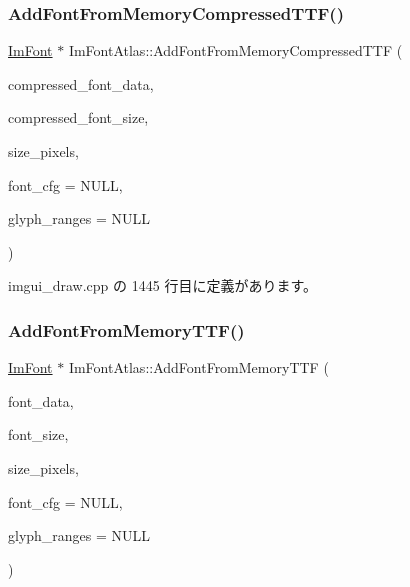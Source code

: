 \subsubsection{\texorpdfstring{Add\+Font\+From\+Memory\+Compressed\+T\+T\+F()}{AddFontFromMemoryCompressedTTF()}}
{\footnotesize\ttfamily \mbox{\hyperlink{struct_im_font}{Im\+Font}} $\ast$ Im\+Font\+Atlas\+::\+Add\+Font\+From\+Memory\+Compressed\+T\+TF (\begin{DoxyParamCaption}\item[{const void $\ast$}]{compressed\+\_\+font\+\_\+data,  }\item[{int}]{compressed\+\_\+font\+\_\+size,  }\item[{float}]{size\+\_\+pixels,  }\item[{const \mbox{\hyperlink{struct_im_font_config}{Im\+Font\+Config}} $\ast$}]{font\+\_\+cfg = {\ttfamily NULL},  }\item[{const \mbox{\hyperlink{imgui_8h_af2c7badaf05a0008e15ef76d40875e97}{Im\+Wchar}} $\ast$}]{glyph\+\_\+ranges = {\ttfamily NULL} }\end{DoxyParamCaption})}



 imgui\+\_\+draw.\+cpp の 1445 行目に定義があります。

\mbox{\label{struct_im_font_atlas_adb01397920998a18e25bd8fed3f791a7}} 
\subsubsection{\texorpdfstring{Add\+Font\+From\+Memory\+T\+T\+F()}{AddFontFromMemoryTTF()}}
{\footnotesize\ttfamily \mbox{\hyperlink{struct_im_font}{Im\+Font}} $\ast$ Im\+Font\+Atlas\+::\+Add\+Font\+From\+Memory\+T\+TF (\begin{DoxyParamCaption}\item[{void $\ast$}]{font\+\_\+data,  }\item[{int}]{font\+\_\+size,  }\item[{float}]{size\+\_\+pixels,  }\item[{const \mbox{\hyperlink{struct_im_font_config}{Im\+Font\+Config}} $\ast$}]{font\+\_\+cfg = {\ttfamily NULL},  }\item[{const \mbox{\hyperlink{imgui_8h_af2c7badaf05a0008e15ef76d40875e97}{Im\+Wchar}} $\ast$}]{glyph\+\_\+ranges = {\ttfamily NULL} }\end{DoxyParamCaption})}




